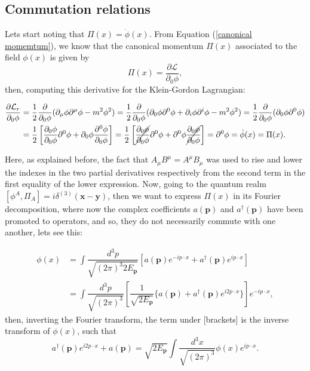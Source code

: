 \subsection{Commutation relations}

Lets start noting that $\Pi(x) = \dot{\phi}(x)$. From Equation (\ref{canonical momemtum}), we know that the canonical momentum $\Pi(x)$ associated to the field $\phi(x)$ is given by
\begin{equation*}
    \Pi(x) = \dfrac{\partial\mathcal{L}}{\partial_0\phi},
\end{equation*}
then, computing this derivative for the Klein-Gordon Lagrangian:

\begin{align*}
    \dfrac{\partial\mathcal{L}_r}{\partial_0\phi} &= \dfrac{1}{2}\dfrac{\partial}{\partial_0\phi}(\partial_{\mu}\phi\partial^{\mu}\phi - m^2\phi^2) = \dfrac{1}{2}\dfrac{\partial}{\partial_0\phi}(\partial_0\phi\partial^0\phi + \partial_i\phi\partial^i\phi - m^2\phi^2) = \dfrac{1}{2}\dfrac{\partial}{\partial_0\phi}(\partial_0\phi\partial^0\phi) \\
    &= \dfrac{1}{2}\left[ \dfrac{\partial_0\phi}{\partial_0\phi}\partial^0\phi + \partial_0\phi\dfrac{\partial^0\phi}{\partial_0\phi} \right] = \dfrac{1}{2}\left[ \cancel{\dfrac{\partial_0\phi}{\partial_0\phi}}\partial^0\phi + \partial^0\phi\cancel{\dfrac{\partial_0\phi}{\partial_0\phi}} \right] = \partial^0\phi = \dot{\phi}(x) = \Pi(x).
\end{align*}

Here, as explained before, the fact that $A_{\mu}B^{\mu} = A^{\mu}B_{\mu}$ was used to rise and lower the indexes in the two partial derivatives respectively from the second term in the first equality of the lower expression. Now, going to the quantum realm $[\phi^A,\Pi_A] =i\delta^{(3)}(\bm{x}-\bm{y})$, then we want to express $\Pi(x)$ in its Fourier decomposition, where now the complex coefficients $a(\bm{p})$ and $a^{\dagger}(\bm{p})$ have been promoted to operators, and so, they do not necessarily commute with one another, lets see this:

\begin{align*}
    \phi(x) &= \int \dfrac{d^3p}{\sqrt{(2\pi)^{3}2E_{\bm{p}}}} [a(\bm{p})e^{-ip\cdot x} + a^{\dagger}(\bm{p})e^{ip\cdot x}] \\
    &= \int \dfrac{d^3p}{\sqrt{(2\pi)^{3}}} \left[ \dfrac{1}{\sqrt{2E_{\bm{p}}}} \{a(\bm{p}) + a^{\dagger}(\bm{p})e^{i2p\cdot x}\}\right] e^{-ip\cdot x},
\end{align*}
then, inverting the Fourier transform, the term under [brackets] is the inverse transform of $\phi(x)$, such that 
\begin{equation}
\label{aadagger1}
     a^{\dagger}(\bm{p})e^{i2p\cdot x} + a(\bm{p}) = \sqrt{2E_{\bm{p}}}\int \dfrac{d^3x}{\sqrt{(2\pi)^3}}\phi(x)e^{ip\cdot x}.
\end{equation}

